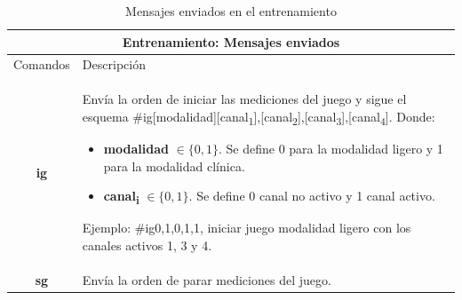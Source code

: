 \begin{table}[ht]
    \centering
    \begin{tabular}{ |c|p{14cm}|}
        \hline
        \multicolumn{2}{|c|}{Entrenamiento: Mensajes enviados} \\
        \hline
        Comandos        &   Descripción \\\hline
        \textbf{ig}     &   \begin{minipage}{14cm}
                                \vspace{2pt}

                                Envía la orden de iniciar las mediciones del juego y sigue el esquema \#ig[modalidad][canal\textsubscript{1}],[canal\textsubscript{2}],[canal\textsubscript{3}],[canal\textsubscript{4}]. Donde:
                                
                                \begin{itemize}
                                    \item \textbf{modalidad} $\in \{0, 1\}$. Se define 0 para la modalidad ligero y 1 para la modalidad clínica.
                                    \item \textbf{canal\textsubscript{i}} $\in \{0, 1\}$. Se define 0 canal no activo y  1 canal activo.  
                                \end{itemize}
                                Ejemplo: \#ig0,1,0,1,1, iniciar juego modalidad ligero con los canales activos 1, 3 y 4.
                                \vspace{2pt}   
                            \end{minipage}\\\hline 
        \textbf{sg}     &   Envía la orden de parar mediciones del juego. \\\hline   
                                
    \end{tabular}
    \caption{Mensajes enviados en el entrenamiento}
    \label{table:send-msg-in-game}
\end{table}

